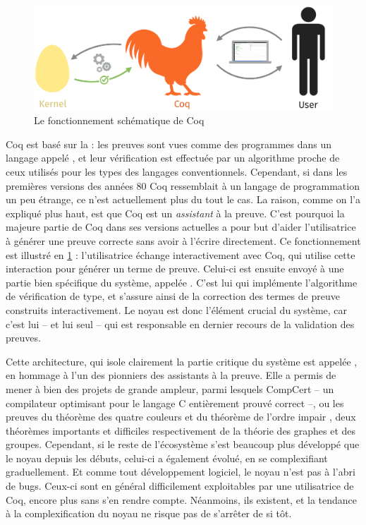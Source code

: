 \begin{figure}[h]

  \centering
  \includegraphics{./figures/coq-kernel-fr.pdf}

  \caption{Le fonctionnement schématique de Coq}
  \label{fig-coq}
\end{figure}

Coq est basé sur la  : les preuves sont vues comme des programmes dans un langage appelé ,
et leur vérification est effectuée par un algorithme proche
de ceux utilisés pour les types des langages conventionnels.
Cependant, si dans les premières versions des années 80 Coq ressemblait à un langage de programmation un peu étrange, ce n’est actuellement plus du tout le cas.
La raison, comme on l’a expliqué plus haut, est que Coq est un \emph{assistant} à la preuve.
C’est pourquoi la majeure partie de Coq dans ses versions actuelles a pour but d’aider l’utilisatrice à générer une preuve correcte sans avoir à l’écrire directement.
Ce fonctionnement est illustré en \cref{fig-coq} : l’utilisatrice échange interactivement avec Coq, qui utilise cette interaction pour générer un terme de preuve. Celui-ci est ensuite envoyé à une partie bien spécifique du système, appelée .
C’est lui qui implémente l’algorithme de vérification de type, et s’assure ainsi de la correction des termes de preuve construits interactivement.
Le noyau est donc l’élément crucial du système, car c’est lui – et lui seul – qui est responsable en dernier recours de la validation des preuves.


Cette architecture, qui isole clairement la partie critique du système
est appelée  , en 
hommage à l’un des pionniers des assistants à la preuve.
Elle a permis de mener à bien des projets de grande ampleur, parmi lesquels CompCert  – un compilateur optimisant pour le langage C entièrement prouvé correct –, ou les preuves du théorème des quatre couleurs  et du théorème de l’ordre impair , deux théorèmes importants et difficiles respectivement de la théorie des graphes et des groupes.
Cependant, si le reste de l’écosystème s’est beaucoup plus développé que le noyau depuis les débuts, celui-ci a également évolué, en se complexifiant graduellement.
Et comme tout développement logiciel, le noyau n’est pas à l’abri de bugs.
Ceux-ci sont en général difficilement exploitables par une utilisatrice de Coq, encore plus sans s’en rendre compte.
Néanmoins, ils existent, et la tendance à la complexification du noyau ne risque pas de s’arrêter de si tôt.

